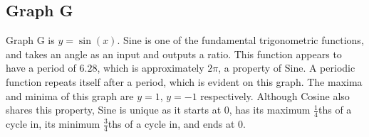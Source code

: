 \subsection{Graph G}

Graph G is $y=\sin(x)$.
Sine is one of the fundamental trigonometric functions, and takes an angle as an input and outputs a ratio.
This function appears to have a period of ${6.28}$, which is approximately ${2\pi}$, a property of Sine.
A periodic function repeats itself after a period, which is evident on this graph.
The maxima and minima of this graph are $y=1$, $y={-1}$ respectively.
Although Cosine also shares this property, Sine is unique as it starts at 0, has its maximum $\frac{1}{4}$ths of a cycle in, its minimum $\frac{3}{4}$ths of a cycle in, and ends at $0$.
